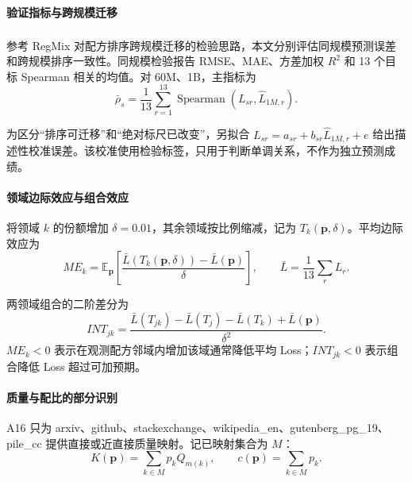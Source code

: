 \documentclass[bwprint]{gmcmthesis}
\newcommand{\E}{\mathbb{E}}
\numberwithin{equation}{section}
\numberwithin{figure}{section}
\numberwithin{table}{section}
\begin{document}
        
        \paragraph{验证指标与跨规模迁移}
        参考 RegMix 对配方排序跨规模迁移的检验思路\textsuperscript{\cite{liu2025regmix}}，本文分别评估同规模预测误差和跨规模排序一致性。同规模检验报告 RMSE、MAE、方差加权 $R^2$ 和 13 个目标 Spearman 相关的均值。对 60M、1B，主指标为
        \begin{equation}
        \bar\rho_s=\frac1{13}\sum_{r=1}^{13}
        \operatorname{Spearman}(L_{sr},\widehat L_{1M,r}).
        \label{eq:spearman}
        \end{equation}
        
        为区分``排序可迁移''和``绝对标尺已改变''，另拟合
        $L_{sr}=a_{sr}+b_{sr}\widehat L_{1M,r}+e$ 给出描述性校准误差。该校准使用检验标签，只用于判断单调关系，不作为独立预测成绩。

        
        \paragraph{领域边际效应与组合效应}
        将领域 $k$ 的份额增加 $\delta=0.01$，其余领域按比例缩减，记为 $T_k(\bm p,\delta)$。平均边际效应为
        \begin{equation}
        ME_k=\E_{\bm p}\left[
        \frac{\bar L(T_k(\bm p,\delta))-\bar L(\bm p)}{\delta}
        \right],\qquad
        \bar L=\frac1{13}\sum_rL_r.
        \label{eq:marginal}
        \end{equation}
        
        两领域组合的二阶差分为
        \begin{equation}
        INT_{jk}=\frac{
        \bar L(T_{jk})-\bar L(T_j)-\bar L(T_k)+\bar L(\bm p)
        }{\delta^2}.
        \label{eq:interaction}
        \end{equation}
        $ME_k<0$ 表示在观测配方邻域内增加该域通常降低平均 Loss；$INT_{jk}<0$ 表示组合降低 Loss 超过可加预期。

        
        \paragraph{质量与配比的部分识别}
        A16 只为 arxiv、github、stackexchange、wikipedia\_en、gutenberg\_pg\_19、pile\_cc 提供直接或近直接质量映射。记已映射集合为 $M$：
        \begin{equation}
        K(\bm p)=\sum_{k\in M}p_kQ_{m(k)},\qquad
        c(\bm p)=\sum_{k\in M}p_k.
        \label{eq:mapped}
        \end{equation}
        
\end{document}
